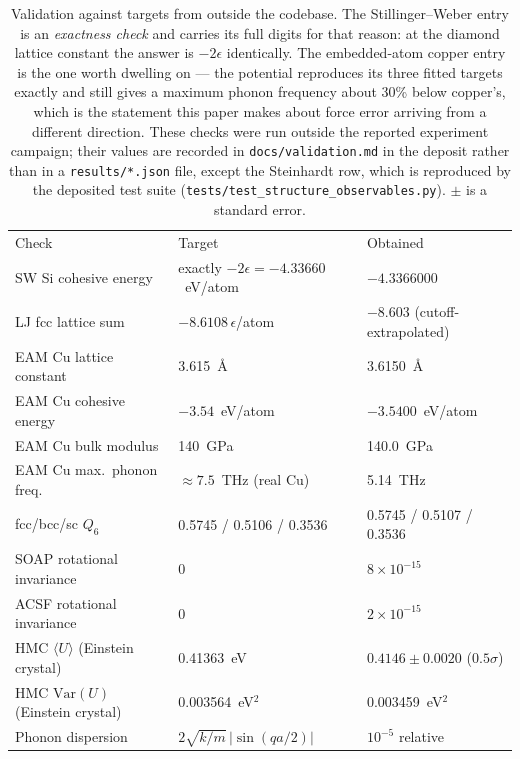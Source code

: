 \documentclass[aip,jcp,reprint,amsmath,amssymb,floatfix]{revtex4-2}
\newcommand{\avg}[1]{\ensuremath{\langle #1 \rangle}}
\newcommand{\Var}{\ensuremath{\mathrm{Var}}}
\begin{document}
\begin{table}[t]
\caption{\label{tab:validation}%
Validation against targets from outside the codebase. The Stillinger--Weber
entry is an \emph{exactness check} and carries its full digits for that reason:
at the diamond lattice constant the answer is $-2\epsilon$ identically. The
embedded-atom copper entry is the one worth dwelling on --- the potential
reproduces its three fitted targets exactly and still gives a maximum phonon
frequency about 30\% below copper's, which is the statement this paper makes
about force error arriving from a different direction. These checks were run
outside the reported experiment campaign; their values are recorded in
\texttt{docs/validation.md} in the deposit rather than in a
\texttt{results/*.json} file, except the Steinhardt row, which is reproduced by
the deposited test suite (\texttt{tests/test\_structure\_observables.py}).
$\pm$ is a standard error.}
\begin{ruledtabular}
\begin{tabular}{lll}
Check & Target & Obtained \\
\colrule
SW Si cohesive energy & exactly $-2\epsilon = -4.33660$~eV/atom & $-4.3366000$ \\
LJ fcc lattice sum & $-8.6108\,\epsilon$/atom & $-8.603$ (cutoff-extrapolated) \\
EAM Cu lattice constant & 3.615~\AA & 3.6150~\AA \\
EAM Cu cohesive energy & $-3.54$~eV/atom & $-3.5400$~eV/atom \\
EAM Cu bulk modulus & 140~GPa & 140.0~GPa \\
EAM Cu max.\ phonon freq. & $\approx 7.5$~THz (real Cu) & 5.14~THz \\
fcc/bcc/sc $Q_6$ & 0.5745 / 0.5106 / 0.3536 & 0.5745 / 0.5107 / 0.3536 \\
SOAP rotational invariance & 0 & $8\times10^{-15}$ \\
ACSF rotational invariance & 0 & $2\times10^{-15}$ \\
HMC $\avg{U}$ (Einstein crystal) & 0.41363~eV & $0.4146 \pm 0.0020$ ($0.5\sigma$) \\
HMC $\Var(U)$ (Einstein crystal) & 0.003564~eV$^2$ & 0.003459~eV$^2$ \\
Phonon dispersion & $2\sqrt{k/m}\,|\sin(qa/2)|$ & $10^{-5}$ relative \\
\end{tabular}
\end{ruledtabular}
\end{table}



\end{document}
